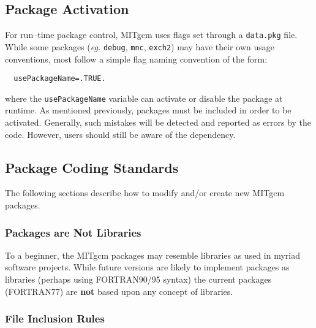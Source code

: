 \subsection{Package Activation}

For run--time package control, MITgcm uses flags set through a
\texttt{data.pkg} file.  While some packages (\textit{eg.}
\texttt{debug}, \texttt{mnc}, \texttt{exch2}) may have their own usage
conventions, most follow a simple flag naming convention of the form:
\begin{verbatim}
  usePackageName=.TRUE.
\end{verbatim}
where the \texttt{usePackageName} variable can activate or disable the
package at runtime.  As mentioned previously, packages must be
included in order to be activated.  Generally, such mistakes will be
detected and reported as errors by the code.  However, users should
still be aware of the dependency.


\subsection{Package Coding Standards}

The following sections describe how to modify and/or create new MITgcm
packages.

\subsubsection{Packages are Not Libraries}

To a beginner, the MITgcm packages may resemble libraries as used in
myriad software projects.  While future versions are likely to
implement packages as libraries (perhaps using FORTRAN90/95 syntax)
the current packages (FORTRAN77) are \textbf{not} based upon any
concept of libraries.

\subsubsection{File Inclusion Rules}


